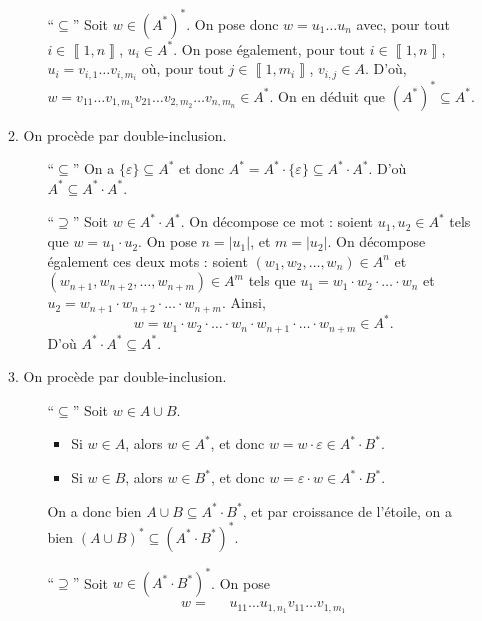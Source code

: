 \begin{enumerate}
\begin{enumerate}[label=\textit{(\arabic*)}]
\begin{itemize}
					\item[``$\subseteq$\/''] Soit $w \in (A^*)^*$. On pose donc $w = u_1\ldots u_n$\/ avec, pour tout $i \in \left\llbracket 1,n \right\rrbracket$, $u_i \in A^*$. On pose également, pour tout $i \in \left\llbracket 1,n \right\rrbracket$, $u_i = v_{i,1}\ldots v_{i,m_i}$\/ où, pour tout $j \in \left\llbracket 1,m_i \right\rrbracket$, $v_{i,j} \in A$.
						D'où, $w = v_{11}\ldots v_{1,m_1}v_{21}\ldots v_{2,m_2}\ldots v_{n,m_n} \in A^*$. On en déduit que $(A^*)^* \subseteq A^*$.
				\end{itemize}
			\item On procède par double-inclusion.
				\begin{itemize}
					\item[``$\subseteq$''] On a $\{\varepsilon\} \subseteq A^*$\/ et donc $A^* = A^* \cdot \{\varepsilon\}  \subseteq A^* \cdot A^*$. D'où $A^* \subseteq A^* \cdot A^*$.
					\item[``$\supseteq$''] Soit $w \in A^* \cdot A^*$. On décompose ce mot : soient $u_1, u_2 \in A^*$\/ tels que $w = u_1 \cdot u_2$. On pose $n = |u_1|$, et $m = |u_2|$. On décompose également ces deux mots : soient $(w_{1},w_{2},\ldots,w_{n}) \in A^n$\/ et $(w_{n+1},w_{n+2},\ldots,w_{n+m}) \in A^m$\/ tels que $u_1 = w_{1}\cdot w_{2}\cdot \ldots \cdot w_{n}$\/ et $u_2 = w_{n+1}\cdot w_{n+2}\cdot \ldots\cdot w_{n+m}$. Ainsi, \[
							w = w_1 \cdot w_2 \cdot \ldots \cdot w_n \cdot w_{n+1} \cdot \ldots \cdot w_{n+m} \in A^*.
						\] D'où $A^* \cdot A^* \subseteq A^*$.
				\end{itemize}
			\item On procède par double-inclusion.
				\begin{itemize}
					\item[``$\subseteq$''] Soit $w \in A \cup B$.
						\begin{itemize}
							\item Si $w \in A$, alors $w \in A^*$, et donc $w = w \cdot \varepsilon \in A^* \cdot B^*$.
							\item Si $w \in B$, alors $w \in B^*$, et donc $w = \varepsilon \cdot w \in A^* \cdot B^*$.
						\end{itemize}
						On a donc bien $A \cup B \subseteq A^* \cdot B^*$, et par croissance de l'étoile, on a bien $(A \cup B)^* \subseteq (A^* \cdot B^*)^*$.
					\item[``$\supseteq$''] Soit $w \in (A^* \cdot B^*)^*$. On pose
						\begin{align*}
							w =& \mathbin{\phantom{\cdot}}u_{11}\ldots u_{1,n_1}v_{11}\ldots v_{1,m_1}\\

\end{align*}
\end{itemize}
\end{enumerate}
\end{enumerate}
